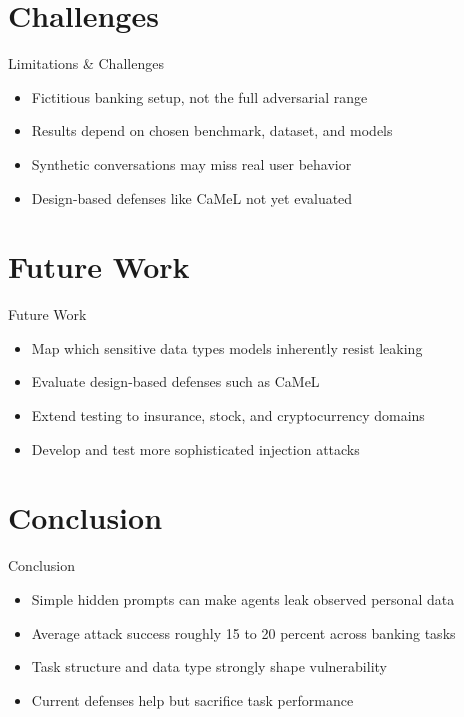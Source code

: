 \documentclass[10pt]{beamer}
\begin{document}
\section{Challenges}
\begin{frame}{Limitations \& Challenges}
\begin{itemize}
  \item Fictitious banking setup, not the full adversarial range
  \item Results depend on chosen benchmark, dataset, and models
  \item Synthetic conversations may miss real user behavior
  \item Design-based defenses like CaMeL not yet evaluated
\end{itemize}
\end{frame}

\section{Future Work}
\begin{frame}{Future Work}
\begin{itemize}
  \item Map which sensitive data types models inherently resist leaking
  \item Evaluate design-based defenses such as CaMeL
  \item Extend testing to insurance, stock, and cryptocurrency domains
  \item Develop and test more sophisticated injection attacks
\end{itemize}
\end{frame}

\section{Conclusion}
\begin{frame}{Conclusion}
\begin{itemize}
  \item Simple hidden prompts can make agents leak observed personal data
  \item Average attack success roughly 15 to 20 percent across banking tasks
  \item Task structure and data type strongly shape vulnerability
  \item Current defenses help but sacrifice task performance
\end{itemize}
\end{frame}
\end{document}
